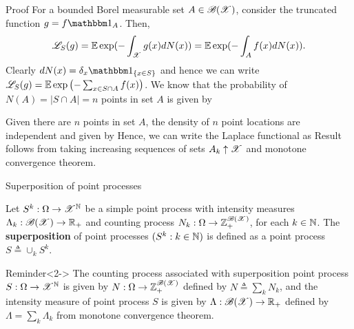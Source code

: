 \documentclass[12pt,aspectratio=169]{beamer}
\begin{document}
\begin{frame}
\begin{block}{Proof}
For a bounded Borel measurable set $A \in \mathscr{B}(\mathscr{X})$, consider the truncated function $g = f\Ind{A}$. 
Then,
\begin{equation*}
\mathscr{L}_{S}(g) 
= \mathbb{E}\exp(-\int_{\mathscr{X}}g(x)dN(x)) 
= \mathbb{E}\exp(-\int_{A}f(x)dN(x)).
\end{equation*} 
Clearly $dN(x) = \delta_{x}\SetIn{x \in S}$ and hence we can write $\mathscr{L}_{S}(g) = \mathbb{E}\exp\left(-\sum_{x \in S\cap A}f(x)\right)$. 
We know that the probability of $N(A) = |S \cap A| = n$ points in set $A$ is given by 
\end{block}
\end{frame}

\begin{frame}
\begin{Proof}
Given there are $n$ points in set $A$, the density of $n$ point locations are independent and given by
Hence, we can write the Laplace functional as 
Result follows from taking increasing sequences of sets $A_k \uparrow \mathscr{X}$ and monotone convergence theorem.
\end{Proof}
\end{frame}

\begin{frame}{Superposition of point processes}
\begin{Definition}
Let $S^k:\Omega\to\mathscr{X}^{\mathbb{N}}$ be a simple point process with intensity measures $\Lambda_k:\mathscr{B}(\mathscr{X})\to\mathbb{R}_+$ and counting process $N_k:\Omega\to\mathbb{Z}_+^{\mathscr{B}(\mathscr{X})}$, 
for each $k \in \mathbb{N}$. 
The \textbf{superposition} of point processes $(S^k: k \in \mathbb{N})$ is defined as a point process $S \triangleq \cup_kS^k$.
\end{Definition}
\begin{block}{Reminder}<2->
The counting process associated with superposition point process $S: \Omega\to\mathscr{X}^{\mathbb{N}}$ is given by $N: \Omega\to\mathbb{Z}_+^{\mathscr{B}(\mathscr{X})}$
defined by $N \triangleq \sum_kN_k$, 
and the intensity measure of point process $S$ is given by $\Lambda: \mathscr{B}(\mathscr{X})\to\mathbb{R}_+$ defined by $\Lambda = \sum_k\Lambda_k$ from monotone convergence theorem.
\end{block}
\end{frame}
\end{document}
